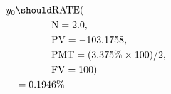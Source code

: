 \begin{align*}
y_{0}&\should\text{RATE}(\\
	&\hspace{.5in}\text{N}=2.0,\\
	&\hspace{.5in}\text{PV}=-103.1758,\\
	&\hspace{.5in}\text{PMT}=(3.375\%\times 100)/2,\\
	&\hspace{.5in}\text{FV}=100)\\
	&=0.1946\%
\end{align*}
